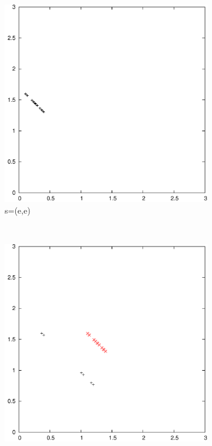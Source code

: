 \documentclass{article}
\begin{document}
	\begin{figure}
		\begin{subfigure}[b]{0.3\textwidth}
			\centering
			\includegraphics[width=\textwidth]{images/t2s0}
			\caption{s=(e,e)}
			\label{fig:t2s0}
		\end{subfigure}
		~
		\begin{subfigure}[b]{0.3\textwidth}
			\centering
			\includegraphics[width=\textwidth]{images/t2s1}

\end{subfigure}
\end{figure}
\end{document}
